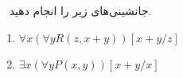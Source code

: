 ~
جانشینی‌های زیر را انجام دهید.
\begin{enumerate}
  \item $\forall x (\forall y R(z, x + y))[x+y/z]$
  \item $\exists x (\forall y P(x, y))[x+y/x]$
\end{enumerate}
